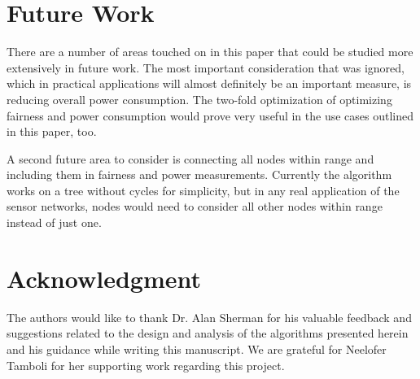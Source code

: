 \documentclass[11pt,conference]{IEEEtran}
\begin{document}
\section{Future Work}\label{futureWork}

There are a number of areas touched on in this paper that could be studied more extensively in future work.  The most important consideration that was ignored, which in practical applications will almost definitely be an important measure, is reducing overall power consumption.  The two-fold optimization of optimizing fairness and power consumption would prove very useful in the use cases outlined in this paper, too.

A second future area to consider is connecting all nodes within range and including them in fairness and power measurements.  Currently the algorithm works on a tree without cycles for simplicity, but in any real application of the sensor networks, nodes would need to consider all other nodes within range instead of just one.


\section*{Acknowledgment}

The authors would like to thank Dr. Alan Sherman for his valuable feedback and suggestions related to the design and analysis of the algorithms presented herein and his guidance while writing this manuscript. We are grateful for Neelofer Tamboli for her supporting work regarding this project.






\onecolumn


\end{document}
